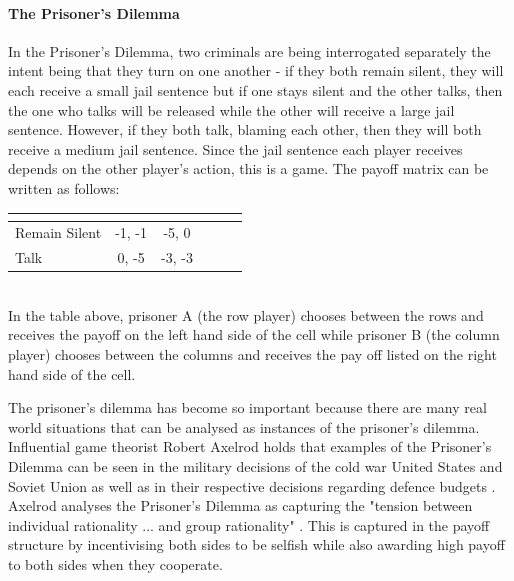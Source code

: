 \documentclass[11pt]{book}
\newcommand*{\np}{\par\noindent\newline}
\begin{document}
\paragraph{The Prisoner's Dilemma}
In the Prisoner's Dilemma, two criminals are being interrogated
separately the intent being that they turn on one another - if they both
remain silent, they will each receive a small jail sentence but if one
stays silent and the other talks, then the one who talks will be released while
the other will receive a large jail sentence. However, if they both
talk, blaming each other, then they will both receive a medium jail sentence.
Since the jail sentence each player receives depends on the other player's
action, this is a game. The payoff matrix can be written as follows:
\begin{center}
   \begin{tabular}{|l||*{5}{c|}}\hline
	\label{prisoner_payoff}
	\backslashbox{Prisoner A}{Prisoner B}
	&\makebox[7em]{Remain Silent}&\makebox[7em]{Talk}\\\hline\hline
	Remain Silent & -1, -1 & -5, 0\\\hline
	Talk & 0, -5 & -3, -3 \\\hline
	\end{tabular}
\end{center}\mbox{}\\
In the table above, prisoner A (the row player) chooses between the rows and
receives the payoff on the left hand side of the cell while prisoner B (the
column player) chooses between the columns and receives the pay off listed on
the right hand side of the cell.

\np The prisoner's dilemma has become so important because there are many real world situations that can be analysed as instances of the prisoner's dilemma. Influential game theorist Robert Axelrod holds that examples of the Prisoner's Dilemma can be seen in the military decisions of the cold war United States and Soviet Union as well as in their respective decisions regarding defence budgets \citep{axelrod_effective_1980}. 
Axelrod analyses the Prisoner's Dilemma as capturing the "tension between  individual rationality ... and group rationality" \cite[p. 4]{axelrod_effective_1980}. This is captured in the payoff structure by incentivising both sides to be selfish while also awarding high payoff to both sides when they cooperate.
\end{document}
